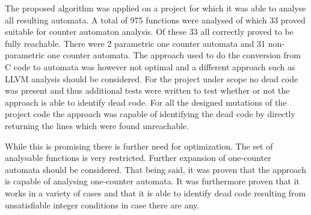 \documentclass[12pt]{thesis}
\begin{document}
The proposed algorithm was applied on a project for which it was able to analyse all resulting automata. A total of 975 functions were analysed of which 33 proved suitable for counter automaton analysis. Of these 33 all correctly proved to be fully reachable. There were 2 parametric one counter automata and 31 non-parametric one counter automata. The approach used to do the conversion from C code to automata was however not optimal and a different approach such as LLVM analysis should be considered. For the project under scope no dead code was present and thus additional tests were written to test whether or not the approach is able to identify dead code. For all the designed mutations of the project code the approach was capable of identifying the dead code by directly returning the lines which were found unreachable.

While this is promising there is further need for optimization. The set of analysable functions is very restricted. Further expansion of one-counter automata should be considered. That being said, it was proven that the approach is capable of analysing one-counter automata. It was furthermore proven that it works in a variety of cases and that it is able to identify dead code resulting from unsatisfiable integer conditions in case there are any.
\printbibliography
\end{document}
